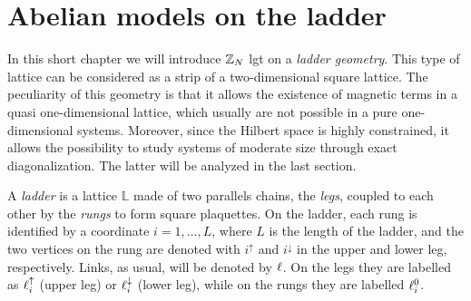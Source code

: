 \section{Abelian models on the ladder}
\label{sec:abelian_models_on_the_ladder}

In this short chapter we will introduce $\mathbb{Z}_N$ \ac{lgt} on a \emph{ladder geometry}.
This type of lattice can be considered as a strip of a two-dimensional square lattice.
The peculiarity of this geometry is that it allows the existence of magnetic terms in a quasi one-dimensional lattice, which usually are not possible in a pure one-dimensional systems.
Moreover, since the Hilbert space is highly constrained, it allows the possibility to study systems of moderate size through exact diagonalization.
The latter will be analyzed in the last section.

A \emph{ladder} is a lattice $\mathbb{L}$ made of two parallels chains, the \emph{legs}, coupled to each other by the \emph{rungs} to form square plaquettes.
On the ladder, each rung is identified by a coordinate $i=1,\dots,L$, where $L$ is the length of the ladder, and the two vertices on the rung are denoted with $i^{\uparrow}$ and $i^{\downarrow}$ in the upper and lower leg, respectively.
Links, as usual, will be denoted by $\ell$.
On the legs they are labelled as $\ell^\uparrow_i$ (upper leg) or $\ell^\downarrow_i$ (lower leg), while on the rungs they are labelled $\ell^0_i$.

